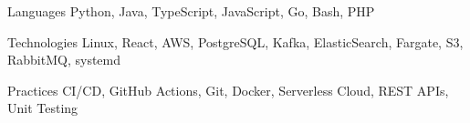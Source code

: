 

\begin{cvskills}

  \cvskill
    {Languages} %
    {Python, Java, TypeScript, JavaScript, Go, Bash, PHP} %

  \cvskill
    {Technologies} %
    {Linux, React, AWS, PostgreSQL, Kafka, ElasticSearch, Fargate, S3, RabbitMQ, systemd} %
    
  \cvskill
    {Practices}
    {CI/CD, GitHub Actions, Git, Docker, Serverless Cloud, REST APIs, Unit Testing}


\end{cvskills}
